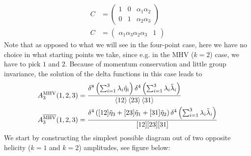 \documentclass[a4paper,12pt]{article}
\begin{document}
\begin{equation}
	\begin{aligned}
		C&=\begin{pmatrix}
			1 & 0 & \alpha_1\alpha_2 \\ 0 & 1 & \alpha_2\alpha_3
		\end{pmatrix}\\
	C&=\begin{pmatrix}
		\alpha_1\alpha_3 \alpha_2\alpha_3 & 1
	\end{pmatrix}
	\end{aligned}
\end{equation}
Note that as opposed to what we will see in the four-point case, here we have no choice in what starting points we take, since e.g. in the MHV ($k=2$) case, we have to pick $1$ and $2$. Because of momentum conservation and little group invariance, the solution of the delta functions in this case leads to 
\begin{equation}
	\begin{aligned}
		A_3^{\text{MHV}}(1,2,3)&=\frac{\delta^{8}\left(\sum_{i=1}^{3}\lambda_i\tilde\eta_i\right)\delta^{4}\left(\sum_{i=1}^{3}\lambda_i\tilde\lambda_i\right)}{\expval{12}\expval{23}\expval{31}}\\
		A_3^{\overline{\text{MHV}}}(1,2,3)&=\frac{\delta^{4}\left([12]\tilde\eta_3+[23]\tilde\eta_1+[31]\tilde\eta_2\right)\delta^{4}\left(\sum_{i=1}^{3}\lambda_i\tilde\lambda_i\right)}{[12][23][31]}\\
	\end{aligned}
\end{equation}
We start by constructing the simplest possible diagram out of two opposite helicity ($k=1$ and $k=2$) amplitudes, see figure below:
\begin{figure}[H]\centering\hspace*{3cm}
\end{figure}
\end{document}
